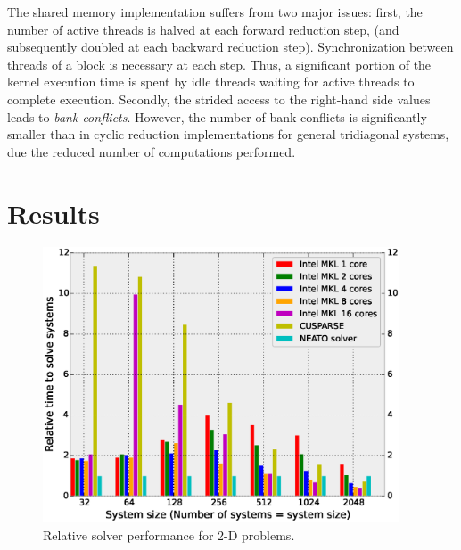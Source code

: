 \documentclass{elsarticle}
\begin{document}
The shared memory implementation suffers from two major issues:
first, the number of active threads is halved at each forward reduction step,
(and subsequently doubled at each backward reduction step).
Synchronization between threads of a block is necessary at each step.
Thus, a significant portion of the kernel execution time is
spent by idle threads waiting for active threads to complete execution.
Secondly, the strided access to the
right-hand side values leads to \emph{bank-conflicts}.
However, the number of bank conflicts is significantly smaller
than in cyclic reduction implementations for general tridiagonal systems,
due the reduced number of computations performed.

\section{Results} \label{sec:results-single-gpu}

\begin{figure}[h!]
\begin{center}
\includegraphics[width=300pt]{fig/bench-2d.eps}
\caption{Relative solver performance for 2-D problems.}
\label{fig:bench-2d}
\end{center}
\end{figure}
\end{document}
